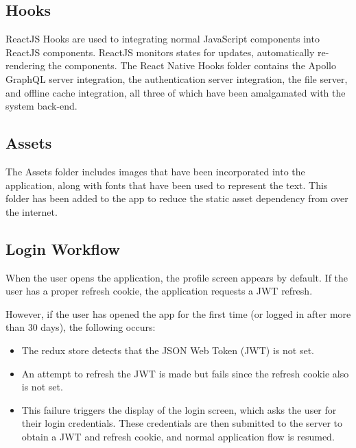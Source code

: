 \subsection{Hooks}
ReactJS Hooks are used to integrating normal JavaScript components into ReactJS components. 
ReactJS monitors states for updates, automatically re-rendering the components.
The React Native Hooks folder contains the Apollo GraphQL server integration, 
the authentication server integration, the file server, and offline cache integration, 
all three of which have been amalgamated with the system back-end.

\subsection{Assets}
The Assets folder includes images that have been incorporated into the application, along with fonts that have been used to represent the text. 
This folder has been added to the app to reduce the static asset dependency from over the internet.

\subsection{Login Workflow}
When the user opens the application, the profile screen appears by default. 
If the user has a proper refresh cookie, the application requests a JWT refresh. 

However, if the user has opened the app for the first time (or logged in after more 
than 30 days), the following occurs: 
\begin{itemize}
    \item The redux store detects that the JSON Web Token (JWT) is not set.
    \item An attempt to refresh the JWT is made but fails since the refresh cookie also is not set.
    \item This failure triggers the display of the login screen, which asks the user for their login credentials. These credentials are then submitted to the server to obtain a JWT and refresh cookie, 
    and normal application flow is resumed.
\end{itemize}
